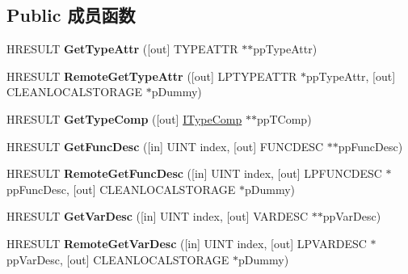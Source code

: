 \subsection*{Public 成员函数}
\begin{DoxyCompactItemize}
\item 
\mbox{\label{interface_i_type_info_acdb2486e7118b818a111a93352e75965}} 
H\+R\+E\+S\+U\+LT {\bfseries Get\+Type\+Attr} (\mbox{[}out\mbox{]} T\+Y\+P\+E\+A\+T\+TR $\ast$$\ast$pp\+Type\+Attr)
\item 
\mbox{\label{interface_i_type_info_adebb5ac8e38cc6ca795eacab79273951}} 
H\+R\+E\+S\+U\+LT {\bfseries Remote\+Get\+Type\+Attr} (\mbox{[}out\mbox{]} L\+P\+T\+Y\+P\+E\+A\+T\+TR $\ast$pp\+Type\+Attr, \mbox{[}out\mbox{]} C\+L\+E\+A\+N\+L\+O\+C\+A\+L\+S\+T\+O\+R\+A\+GE $\ast$p\+Dummy)
\item 
\mbox{\label{interface_i_type_info_a878ab6d649f226464e04dbde6b6940b3}} 
H\+R\+E\+S\+U\+LT {\bfseries Get\+Type\+Comp} (\mbox{[}out\mbox{]} \hyperlink{interface_i_type_comp}{I\+Type\+Comp} $\ast$$\ast$pp\+T\+Comp)
\item 
\mbox{\label{interface_i_type_info_a56392b5fc6838014c4d9610e7a3699a2}} 
H\+R\+E\+S\+U\+LT {\bfseries Get\+Func\+Desc} (\mbox{[}in\mbox{]} U\+I\+NT index, \mbox{[}out\mbox{]} F\+U\+N\+C\+D\+E\+SC $\ast$$\ast$pp\+Func\+Desc)
\item 
\mbox{\label{interface_i_type_info_a0139f6aea93f34c24d00bc4778c7b8ba}} 
H\+R\+E\+S\+U\+LT {\bfseries Remote\+Get\+Func\+Desc} (\mbox{[}in\mbox{]} U\+I\+NT index, \mbox{[}out\mbox{]} L\+P\+F\+U\+N\+C\+D\+E\+SC $\ast$pp\+Func\+Desc, \mbox{[}out\mbox{]} C\+L\+E\+A\+N\+L\+O\+C\+A\+L\+S\+T\+O\+R\+A\+GE $\ast$p\+Dummy)
\item 
\mbox{\label{interface_i_type_info_ad7c913deb503e5c8b99cb43e59af1b67}} 
H\+R\+E\+S\+U\+LT {\bfseries Get\+Var\+Desc} (\mbox{[}in\mbox{]} U\+I\+NT index, \mbox{[}out\mbox{]} V\+A\+R\+D\+E\+SC $\ast$$\ast$pp\+Var\+Desc)
\item 
\mbox{\label{interface_i_type_info_abaa8a5e1b0ac70175fd9a39e8f4b2453}} 
H\+R\+E\+S\+U\+LT {\bfseries Remote\+Get\+Var\+Desc} (\mbox{[}in\mbox{]} U\+I\+NT index, \mbox{[}out\mbox{]} L\+P\+V\+A\+R\+D\+E\+SC $\ast$pp\+Var\+Desc, \mbox{[}out\mbox{]} C\+L\+E\+A\+N\+L\+O\+C\+A\+L\+S\+T\+O\+R\+A\+GE $\ast$p\+Dummy)

\end{DoxyCompactItemize}
